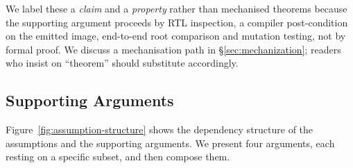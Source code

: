 \documentclass[journal,10pt]{IEEEtran}
\theoremstyle{plain}
\theoremstyle{definition}
\theoremstyle{remark}
\begin{document}
We label these a \emph{claim} and a \emph{property} rather than mechanised
theorems because the supporting argument proceeds by RTL inspection,
a compiler post-condition on the emitted image, end-to-end root comparison
and mutation testing, not by formal proof. We discuss a mechanisation path
in \S\ref{sec:mechanization}; readers who insist on ``theorem'' should
substitute accordingly.

\subsection{Supporting Arguments}\label{sec:abi-args}

Figure~\ref{fig:assumption-structure} shows the dependency structure of
the assumptions and the supporting arguments. We present four arguments,
each resting on a specific subset, and then compose them.
\end{document}
